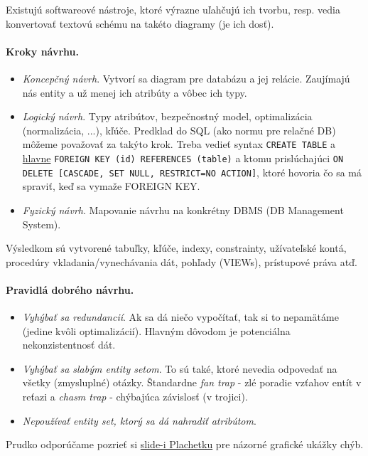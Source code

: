 \documentclass[10pt,a4paper]{article}
\begin{document}
Existujú softwareové nástroje, ktoré výrazne uľahčujú ich tvorbu, resp. vedia konvertovať textovú schému na takéto diagramy (je ich dosť). 

\paragraph{Kroky návrhu.}
\begin{itemize}
\item \emph{Koncepčný návrh}. Vytvorí sa diagram pre databázu a jej relácie. Zaujímajú nás entity a už menej ich atribúty a vôbec ich typy. 
\item \emph{Logický návrh}. Typy atribútov, bezpečnostný model, optimalizácia (normalizácia, ...), kľúče. Predklad do SQL (ako normu pre relačné DB) môžeme považovať za takýto krok. Treba vedieť syntax \verb|CREATE TABLE| a \href{http://dev.mysql.com/doc/refman/5.5/en/innodb-foreign-key-constraints.html}{hlavne} \verb|FOREIGN KEY (id) REFERENCES (table)| a ktomu prislúchajúci \verb|ON DELETE [CASCADE, SET NULL, RESTRICT=NO ACTION]|, ktoré hovoria čo sa má spraviť, keď sa vymaže FOREIGN KEY. 
\item \emph{Fyzický návrh}. Mapovanie návrhu na konkrétny DBMS (DB Management System). 
\end{itemize}

Výsledkom sú vytvorené tabuľky, kľúče, indexy, constrainty, užívateľské kontá,
procedúry vkladania/vynechávania dát, pohľady (VIEWs), prístupové práva atď.

\paragraph{Pravidlá dobrého návrhu.}
\begin{itemize}
\item \emph{Vyhýbať sa redundancií}. Ak sa dá niečo vypočítať, tak si to nepamätáme (jedine kvôli optimalizácií). Hlavným dôvodom je potenciálna nekonzistentnosť dát.  
\item \emph{Vyhýbať sa slabým entity setom}. To sú také, ktoré nevedia odpovedať na všetky (zmysluplné) otázky. Štandardne \emph{fan trap} - zlé poradie vzťahov entít v reťazi  a \emph{chasm trap} - chýbajúca závislosť (v trojici).
\item \emph{Nepoužívať entity set, ktorý sa dá nahradiť atribútom}. 
\end{itemize}

Prudko odporúčame pozrieť si \href{http://www.dcs.fmph.uniba.sk/~plachetk/TEACHING/DB2011/db2011_6.pdf}{slide-i Plachetku} pre názorné grafické ukážky chýb. 
\end{document}
